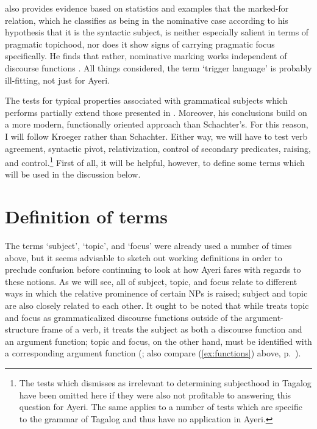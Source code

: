 \citet{kroeger1991} also provides evidence based on statistics and examples
that the marked-for relation, which he classifies as being in the nominative
case according to his hypothesis that it is the syntactic subject, is neither
especially salient in terms of pragmatic topichood, nor does it show signs of
carrying pragmatic focus specifically. He finds that rather, nominative marking
works independent of discourse functions \citep[56\psqq]{kroeger1991}.  All
things considered, the term `trigger language' is probably ill-fitting, not
just for Ayeri.

The tests for typical properties associated with grammatical subjects which
\citet{kroeger1991} performs partially extend those presented in
\citet{schachter1976}. Moreover, his conclusions build on a more modern,
functionally oriented approach than Schachter's. For this reason, I will follow
Kroeger rather than Schachter. Either way, we will have to test verb agreement,
syntactic pivot, relativization, control of secondary predicates, raising, and
control.\footnote{The tests which \citet{kroeger1991} dismisses as irrelevant
to determining subjecthood in Tagalog have been omitted here if they were also
not profitable to answering this question for Ayeri. The same applies to a
number of tests which are specific to the grammar of Tagalog and thus have no
application in Ayeri.} First of all, it will be helpful, however, to define
some terms which will be used in the discussion below.


\section{Definition of terms}

The terms `subject', `topic', and `focus' were already used a number of times
above, but it seems advisable to sketch out working definitions in order to
preclude confusion before continuing to look at how Ayeri fares with regards to
these notions. As we will see, all of subject, topic, and focus relate to
different ways in which the relative prominence of certain NPs is raised;
subject and topic are also closely related to each other. It ought to be noted
that while \Lfg{} treats topic and focus as grammaticalized discourse functions
outside of the argument-structure frame of a verb, it treats the subject as
both a discourse function and an argument function; topic and focus, on the
other hand, must be identified with a corresponding argument function
(\cite[99--100]{bresnan2016}; also compare (\ref{ex:functions}) above,
p.~\pageref{ex:functions}).

